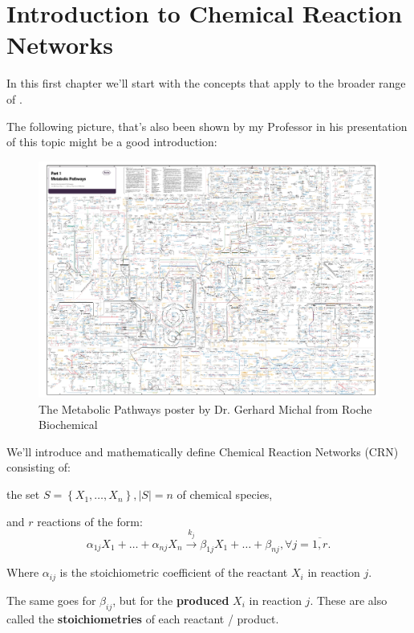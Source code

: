 \chapter{Introduction to Chemical Reaction Networks}\label{chap:ch1}

In this first chapter we'll start with the concepts that apply to the broader range of .

The following picture, that's also been shown by my Professor in his presentation of this topic \parencite{Lorand2024} might be a good introduction:

\begin{figure}[H]
	\centering
	\includegraphics[width=\textwidth]{chem-pics/metabolic-pathways.png}	
	\caption{The Metabolic Pathways poster by Dr. Gerhard Michal from Roche Biochemical \cite{RouchePathways}}
	\label{fig:metabolic-pathways}
\end{figure}

We'll introduce and mathematically define Chemical Reaction Networks (CRN) consisting of:

the set $S = \left\{ X_1, \dots, X_n \right\}, \left| S \right| = n$ of chemical species,

and $r$ reactions of the form:
\begin{equation}\label{mass-action_network}
	\alpha_{1j} X_1 + \dots + \alpha_{n j} X_n \xrightarrow{k_j} \beta_{1j} X_1 + \dots + \beta_{n j}, \forall j = \overline{1,r}.	
\end{equation}

Where $\alpha_{ij}$ is the stoichiometric coefficient of the reactant $X_i$ in reaction $j$.

The same goes for $\beta_{ij}$, but for the \textbf{produced} $X_i$ in reaction $j$. These are also called the \textbf{stoichiometries} of each reactant / product.


